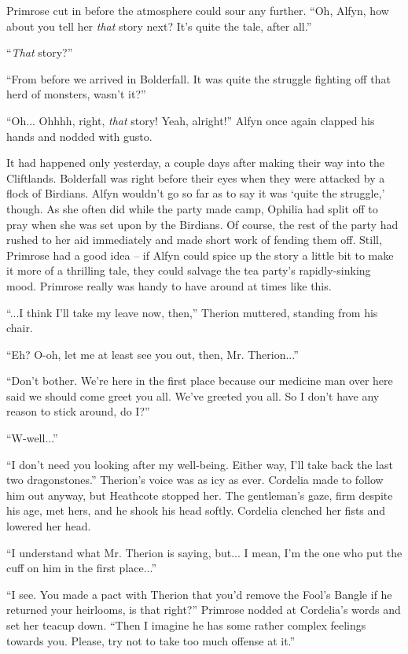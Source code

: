 Primrose cut in before the atmosphere could sour any further. ``Oh, Alfyn, how about you tell her \emph{that} story next? It's quite the tale, after all.''

``\emph{That} story?''

``From before we arrived in Bolderfall. It was quite the struggle fighting off that herd of monsters, wasn't it?''

``Oh... Ohhhh, right, \emph{that} story! Yeah, alright!'' Alfyn once again clapped his hands and nodded with gusto.

It had happened only yesterday, a couple days after making their way into the Cliftlands. Bolderfall was right before their eyes when they were attacked by a flock of Birdians. Alfyn wouldn't go so far as to say it was `quite the struggle,' though. As she often did while the party made camp, Ophilia had split off to pray when she was set upon by the Birdians. Of course, the rest of the party had rushed to her aid immediately and made short work of fending them off. Still, Primrose had a good idea -- if Alfyn could spice up the story a little bit to make it more of a thrilling tale, they could salvage the tea party's rapidly-sinking mood. Primrose really was handy to have around at times like this.

``...I think I'll take my leave now, then,'' Therion muttered, standing from his chair.

``Eh? O-oh, let me at least see you out, then, Mr. Therion...''

``Don't bother. We're here in the first place because our medicine man over here said we should come greet you all. We've greeted you all. So I don't have any reason to stick around, do I?''

``W-well...''

``I don't need you looking after my well-being. Either way, I'll take back the last two dragonstones.'' Therion's voice was as icy as ever. Cordelia made to follow him out anyway, but Heathcote stopped her. The gentleman's gaze, firm despite his age, met hers, and he shook his head softly. Cordelia clenched her fists and lowered her head. 

``I understand what Mr. Therion is saying, but... I mean, I'm the one who put the cuff on him in the first place...''

``I see. You made a pact with Therion that you'd remove the Fool's Bangle if he returned your heirlooms, is that right?'' Primrose nodded at Cordelia's words and set her teacup down. ``Then I imagine he has some rather complex feelings towards you. Please, try not to take too much offense at it.''

